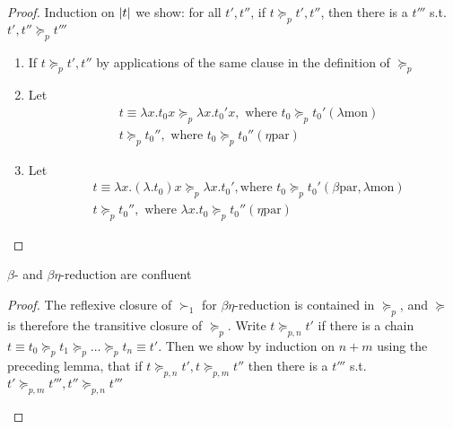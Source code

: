 \documentclass[11pt]{article}
\def \etapar {\eta\text{par}}
\def \lambdamon{\lambda\text{mon}}
\def \betapar {\beta\text{par}}
\begin{document}
\begin{proof}
Induction on \(\abs{t}\) we show: for all \(t',t''\), if \(t\succeq_p t',t''\),
then there is a \(t'''\) s.t. \(t',t''\succeq_p t'''\)
\begin{enumerate}
\item If \(t\succeq_p t',t''\) by applications of the same clause  in the
definition of \(\succeq_p\)
\item Let
\begin{align*}
&t\equiv\lambda x.t_0x\succeq_p\lambda x.t_0'x,\text{ where }t_0\succeq_p t_0'(\lambda\text{mon})\\
&t\succeq_p t_0'',\text{ where }t_0\succeq_p t_0''(\eta\text{par})
\end{align*}
\item Let
\begin{align*}
&t\equiv\lambda x.(\lambda.t_0)x\succeq_p\lambda x.t_0',
\text{where }t_0\succeq_p t_0'(\betapar,\lambdamon)\\
&t\succeq_p t_0'',\text{ where }\lambda x.t_0\succeq_pt_0''(\etapar)
\end{align*}
\end{enumerate}
\end{proof}

\begin{theorem}[]
\(\beta\)- and \(\beta \eta\)-reduction are confluent
\end{theorem}
\begin{proof}
The reflexive closure of \(\succ_1\) for \(\beta \eta\)-reduction is contained in
\(\succeq_p\), and \(\succeq\) is therefore the transitive closure of
\(\succeq_p\). Write \(t\succeq_{p,n}t'\) if there is a chain
\(t\equiv t_0\succeq_p t_1\succeq_p\dots\succeq_pt_n\equiv t'\). Then we show
by induction on \(n+m\) using the preceding lemma, that if
\(t\succeq_{p,n}t',t\succeq_{p,m}t''\) then there is a \(t'''\) s.t.
\(t'\succeq_{p,m}t''',t''\succeq_{p,n}t'''\) 
\begin{center}
\end{center}
\end{proof}
\end{document}

